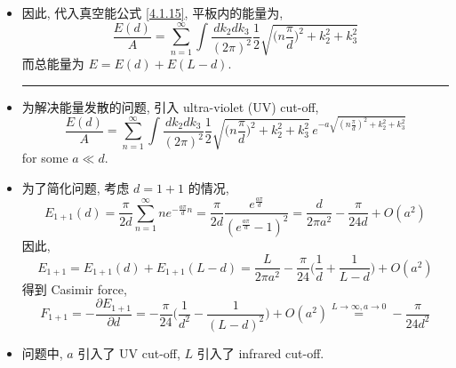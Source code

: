 \begin{itemize}
	\item 因此, 代入真空能公式 \eqref{4.1.15}, 平板内的能量为,
	\begin{equation}
		\frac{E(d)}{A} = \sum_{n = 1}^\infty \int \frac{dk_2 dk_3}{(2 \pi)^2} \frac{1}{2} \sqrt{\Big( n \frac{\pi}{d} \Big)^2 + k_2^2 + k_3^2}
	\end{equation}
	而总能量为 $E = E(d) + E(L - d)$.
	
	\noindent\rule[0.5ex]{\linewidth}{0.5pt} %
	
	\item 为解决能量发散的问题, 引入 ultra-violet (UV) cut-off,
	\begin{equation}
		\frac{E(d)}{A} = \sum_{n = 1}^\infty \int \frac{dk_2 dk_3}{(2 \pi)^2} \frac{1}{2} \sqrt{\Big( n \frac{\pi}{d} \Big)^2 + k_2^2 + k_3^2} \, e^{- a \sqrt{(n \frac{\pi}{d})^2 + k_2^2 + k_3^2}}
	\end{equation}
	for some $a \ll d$.
	
	\item 为了简化问题, 考虑 $d = 1 + 1$ 的情况,
	\begin{equation}
		E_{1 + 1}(d) = \frac{\pi}{2 d} \sum_{n = 1}^\infty n e^{- \frac{a \pi}{d} n} = \frac{\pi}{2 d} \frac{e^{\frac{a \pi}{d}}}{(e^{\frac{a \pi}{d}} - 1)^2} = \frac{d}{2 \pi a^2} - \frac{\pi}{24 d} + O(a^2)
	\end{equation}
	因此,
	\begin{equation}
		E_{1 + 1} = E_{1 + 1}(d) + E_{1 + 1}(L - d) = \frac{L}{2 \pi a^2} - \frac{\pi}{24} \Big( \frac{1}{d} + \frac{1}{L - d} \Big) + O(a^2)
	\end{equation}
	得到 Casimir force,
	\begin{equation}
		F_{1 + 1} = - \frac{\partial E_{1 + 1}}{\partial d} = - \frac{\pi}{24} \Big( \frac{1}{d^2} - \frac{1}{(L - d)^2} \Big) + O(a^2) \overset{L \rightarrow \infty, a \rightarrow 0}{=} - \frac{\pi}{24 d^2}
	\end{equation}
	
	\item 问题中, $a$ 引入了 UV cut-off, $L$ 引入了 infrared cut-off.
\end{itemize}
